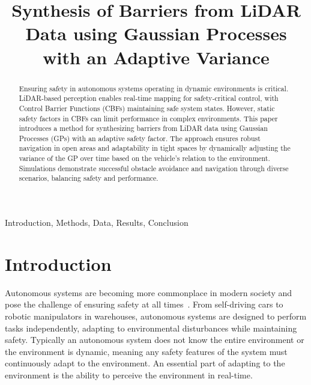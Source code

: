\documentclass[conference]{IEEEtran}
\begin{document}
\title{Synthesis of Barriers from LiDAR Data using Gaussian Processes with an Adaptive Variance}

\author{
}

\maketitle

\begin{abstract}
Ensuring safety in autonomous systems operating in dynamic environments is critical. LiDAR-based perception enables real-time mapping for safety-critical control, with Control Barrier Functions (CBFs) maintaining safe system states. However, static safety factors in CBFs can limit performance in complex environments. This paper introduces a method for synthesizing barriers from LiDAR data using Gaussian Processes (GPs) with an adaptive safety factor. The approach ensures robust navigation in open areas and adaptability in tight spaces by dynamically adjusting the variance of the GP over time based on the vehicle's relation to the environment. Simulations demonstrate successful obstacle avoidance and navigation through diverse scenarios, balancing safety and performance.
\end{abstract}

\begin{IEEEkeywords}
Introduction, Methods, Data, Results, Conclusion
\end{IEEEkeywords}

\section{Introduction}


Autonomous systems are becoming more commonplace in modern society and pose the challenge of ensuring safety at all times~\cite{cbfgp}. From self-driving cars to robotic manipulators in warehouses, autonomous systems are designed to perform tasks independently, adapting to environmental disturbances while maintaining safety. Typically an autonomous system does not know the entire environment or the environment is dynamic, meaning any safety features of the system must continuously adapt to the environment. An essential part of adapting to the environment is the ability to perceive the environment in real-time. 
\end{document}
